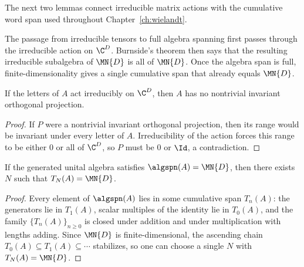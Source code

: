 The next two lemmas connect irreducible matrix actions with the cumulative word
span used throughout Chapter~\ref{ch:wielandt}.

\begin{remark}
    The passage from irreducible tensors to full algebra spanning first passes
    through the irreducible action on $\C^D$. Burnside's theorem then says that
    the resulting irreducible subalgebra of $\MN{D}$ is all of $\MN{D}$. Once
    the algebra span is full, finite-dimensionality gives a single cumulative
    span that already equals $\MN{D}$.
\end{remark}

\begin{lemma}
    \label{lem:irreducible_action_to_tensor}
    \leanok
    If the letters of $A$ act irreducibly on $\C^D$, then $A$ has no nontrivial
    invariant orthogonal projection.
\end{lemma}

\begin{proof}
    \leanok
    If $P$ were a nontrivial invariant orthogonal projection, then its range
    would be invariant under every letter of $A$.
    Irreducibility of the action forces this range to be either $0$ or all of
    $\C^D$, so $P$ must be $0$ or $\Id$, a contradiction.
\end{proof}

\begin{lemma}
    \label{lem:algspan_cumulative_span}
    \leanok
    If the generated unital algebra satisfies $\algspn(A)=\MN{D}$, then there
    exists $N$ such that $T_N(A)=\MN{D}$.
\end{lemma}

\begin{proof}
    \leanok
    Every element of $\algspn(A)$ lies in some cumulative span $T_n(A)$:
    the generators lie in $T_1(A)$, scalar multiples of the identity lie in
    $T_0(A)$, and the family $\{T_n(A)\}_{n\ge0}$ is closed under addition
    and under multiplication with lengths adding.
    Since $\MN{D}$ is finite-dimensional, the ascending chain
    $T_0(A)\subseteq T_1(A)\subseteq\cdots$ stabilizes, so one can choose a
    single $N$ with $T_N(A)=\MN{D}$.
\end{proof}


